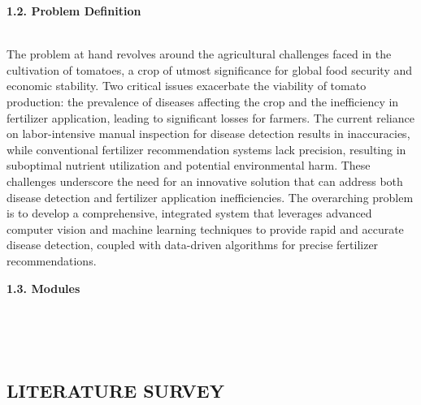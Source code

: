 \documentclass[12pt, English]{article}
\begin{document}
\begin{normalsize}
\begin{enumerate}
\end{enumerate}

\begin{large}
\textbf{1.2. Problem Definition}
\end{large}\\

The problem at hand revolves around the agricultural challenges faced in the cultivation of tomatoes, a crop of utmost significance for global food security and economic stability. Two critical issues exacerbate the viability of tomato production: the prevalence of diseases affecting the crop and the inefficiency in fertilizer application, leading to significant losses for farmers. The current reliance on labor-intensive manual inspection for disease detection results in inaccuracies, while conventional fertilizer recommendation systems lack precision, resulting in suboptimal nutrient utilization and potential environmental harm. These challenges underscore the need for an innovative solution that can address both disease detection and fertilizer application inefficiencies. The overarching problem is to develop a comprehensive, integrated system that leverages advanced computer vision and machine learning techniques to provide rapid and accurate disease detection, coupled with data-driven algorithms for precise fertilizer recommendations.\\ 

\begin{large}
\textbf{1.3. Modules}
\end{large}
\begin{enumerate}

     \\
    \\
    \\
    
\end{enumerate}
 

\newpage
\begin{center}
\section{ \Large LITERATURE SURVEY}
\end{center}



\end{normalsize}
\end{document}
